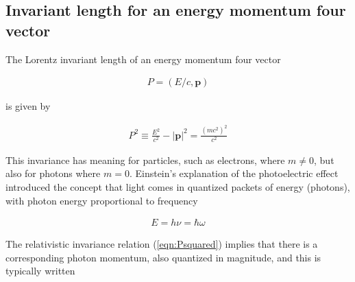 \documentclass[]{eliblog}
\newcommand{\Abs}[1]{{\left\lvert{#1}\right\rvert}}
\newcommand{\Bp}[0]{\mathbf{p}}
\begin{document}
%
%

\subsection{Invariant length for an energy momentum four vector}

The Lorentz invariant length of an energy momentum four vector

\begin{align}
P = (E/c, \Bp)
\end{align}

is given by

\begin{align}\label{eqn:Psquared}
P^2 \equiv \frac{E^2}{c^2} - \Abs{\Bp}^2 = \frac{(m c^2)^2}{c^2}
\end{align}

This invariance has meaning for particles, such as electrons, where $m \ne 0$, but also for photons where $m = 0$.
Einstein's explanation of the photoelectric effect introduced the concept that light comes in
quantized packets of energy (photons), with photon energy proportional to frequency

\begin{align}
E = h \nu = \hbar \omega
\end{align}

The relativistic invariance relation (\ref{eqn:Psquared}) implies that there is a corresponding photon momentum, also
quantized in magnitude, and this is typically written
\end{document}

